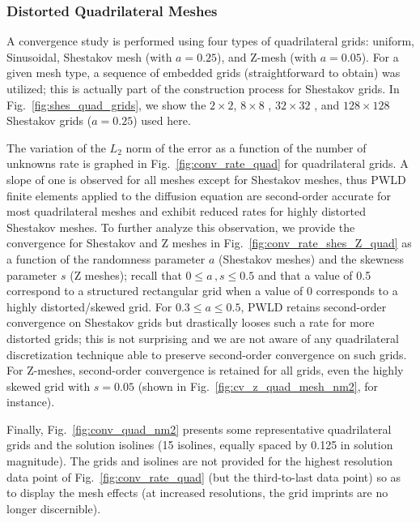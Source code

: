 \documentclass[preprint,10pt]{elsarticle}
\newcommand{\fig}[1]{Fig.~\ref{#1}}                      %
\begin{document}
\subsubsection{Distorted Quadrilateral Meshes}

A convergence study is performed using four types of quadrilateral grids: uniform, Sinusoidal, Shestakov mesh (with $a=0.25$), and Z-mesh (with $a=0.05$).
For a given mesh type, a sequence of embedded grids (straightforward to obtain) was utilized; this is actually part of the construction process for Shestakov grids. In \fig{fig:shes_quad_grids}, we show the $2 \times 2$, $8 \times 8$ , $32 \times 32$ , and $128\times 128$ Shestakov grids ($a=0.25$) used here. 

The  variation of the $L_2$ norm of the error as a function of the number of unknowns rate is graphed in \fig{fig:conv_rate_quad} for quadrilateral grids. A slope of one is observed for all meshes except for Shestakov meshes, thus PWLD finite elements applied to the diffusion equation are second-order accurate for most quadrilateral meshes and exhibit reduced rates for highly distorted Shestakov meshes. To further analyze this observation, we provide the convergence for Shestakov and Z meshes in \fig{fig:conv_rate_shes_Z_quad} as a function of the randomness parameter $a$ (Shestakov meshes) and the skewness parameter $s$ (Z meshes); recall that $0 \le a\, , s \le 0.5$ and that a value of 0.5 correspond to a structured rectangular grid when a value of 0 corresponds to a highly distorted/skewed grid. For $0.3 \le a \le 0.5$, PWLD retains second-order convergence on Shestakov grids but drastically looses such a rate for more distorted grids; this is not surprising and we are not aware of any quadrilateral discretization technique able to preserve second-order convergence on such grids. For Z-meshes, second-order convergence is retained for all grids, even the highly skewed grid with $s=0.05$ (shown in \fig{fig:cv_z_quad_mesh_nm2}, for instance).

Finally, \fig{fig:conv_quad_nm2} presents some representative quadrilateral grids and the solution isolines (15 isolines, equally spaced by 0.125 in solution magnitude). The grids and isolines are not provided for the highest resolution data point of \fig{fig:conv_rate_quad} (but the third-to-last data point) so as to display the mesh effects (at increased resolutions, the grid imprints are no longer discernible).

\pagebreak
\end{document}
